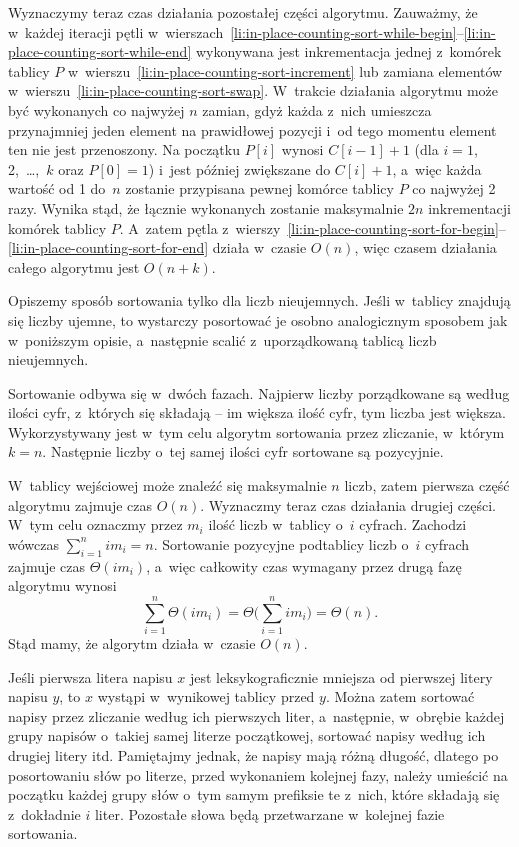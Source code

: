 Wyznaczymy teraz czas działania pozostałej części algorytmu. Zauważmy, że w~każdej iteracji pętli  w~wierszach~\ref{li:in-place-counting-sort-while-begin}\nobreakdash--\ref{li:in-place-counting-sort-while-end} wykonywana jest inkrementacja jednej z~komórek tablicy $P$ w~wierszu~\ref{li:in-place-counting-sort-increment} lub zamiana elementów w~wierszu~\ref{li:in-place-counting-sort-swap}. W~trakcie działania algorytmu może być wykonanych co najwyżej $n$ zamian, gdyż każda z~nich umieszcza przynajmniej jeden element na prawidłowej pozycji i~od tego momentu element ten nie jest przenoszony. Na początku $P[i]$ wynosi $C[i-1]+1$ (dla $i=1$, 2,~\dots,~$k$ oraz $P[0]=1$) i~jest później zwiększane do $C[i]+1$, a~więc każda wartość od 1 do~$n$ zostanie przypisana pewnej komórce tablicy $P$ co najwyżej 2 razy. Wynika stąd, że łącznie wykonanych zostanie maksymalnie $2n$ inkrementacji komórek tablicy $P$. A~zatem pętla  z~wierszy~\ref{li:in-place-counting-sort-for-begin}\nobreakdash--\ref{li:in-place-counting-sort-for-end} działa w~czasie $O(n)$, więc czasem działania całego algorytmu jest $O(n+k)$.


\subproblem %
Opiszemy sposób sortowania tylko dla liczb nieujemnych. Jeśli w~tablicy znajdują się liczby ujemne, to wystarczy posortować je osobno analogicznym sposobem jak w~poniższym opisie, a~następnie scalić z~uporządkowaną tablicą liczb nieujemnych.

Sortowanie odbywa się w~dwóch fazach. Najpierw liczby porządkowane są według ilości cyfr, z~których się składają -- im większa ilość cyfr, tym liczba jest większa. Wykorzystywany jest w~tym celu algorytm sortowania przez zliczanie, w~którym $k=n$. Następnie liczby o~tej samej ilości cyfr sortowane są pozycyjnie.

W~tablicy wejściowej może znaleźć się maksymalnie $n$ liczb, zatem pierwsza część algorytmu zajmuje czas $O(n)$. Wyznaczmy teraz czas działania drugiej części. W~tym celu oznaczmy przez $m_i$ ilość liczb w~tablicy o~$i$ cyfrach. Zachodzi wówczas $\sum_{i=1}^nim_i=n$. Sortowanie pozycyjne podtablicy liczb o~$i$ cyfrach zajmuje czas $\Theta(im_i)$, a~więc całkowity czas wymagany przez drugą fazę algorytmu wynosi
\[
    \sum_{i=1}^n\Theta(im_i) = \Theta\biggl(\sum_{i=1}^nim_i\biggr) = \Theta(n).
\]
Stąd mamy, że algorytm działa w~czasie $O(n)$.

\subproblem %
Jeśli pierwsza litera napisu $x$ jest leksykograficznie mniejsza od pierwszej litery napisu $y$, to $x$ wystąpi w~wynikowej tablicy przed $y$. Można zatem sortować napisy przez zliczanie według ich pierwszych liter, a~następnie, w~obrębie każdej grupy napisów o~takiej samej literze początkowej, sortować napisy według ich drugiej litery itd. Pamiętajmy jednak, że napisy mają różną długość, dlatego po posortowaniu słów po  literze, przed wykonaniem kolejnej fazy, należy umieścić na początku każdej grupy słów o~tym samym prefiksie  te z~nich, które składają się z~dokładnie $i$ liter. Pozostałe słowa będą przetwarzane w~kolejnej fazie sortowania.

